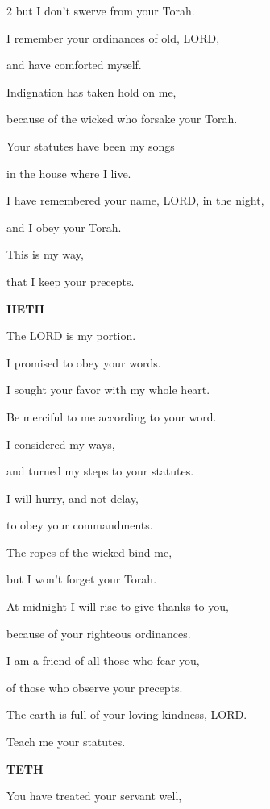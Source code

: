 \begin{multicols}{2}
	but I don’t swerve from your Torah.
	
	
	\myverse{}I remember your ordinances of old, LORD,
	
	and have comforted myself.
	
	
	\myverse{}Indignation has taken hold on me,
	
	because of the wicked who forsake your Torah.
	
	
	\myverse{}Your statutes have been my songs
	
	in the house where I live.
	
	
	\myverse{}I have remembered your name, LORD, in the night,
	
	and I obey your Torah.
	
	
	\myverse{}This is my way,
	
	that I keep your precepts.
	
	\vspace{\baselineskip}
	
	\textbf{HETH}
	
	
	\myverse{}The LORD is my portion.
	
	I promised to obey your words.
	
	
	\myverse{}I sought your favor with my whole heart.
	
	Be merciful to me according to your word.
	
	
	\myverse{}I considered my ways,
	
	and turned my steps to your statutes.
	
	
	\myverse{}I will hurry, and not delay,
	
	to obey your commandments.
	
	
	\myverse{}The ropes of the wicked bind me,
	
	but I won’t forget your Torah.
	
	
	\myverse{}At midnight I will rise to give thanks to you,
	
	because of your righteous ordinances.
	
	
	\myverse{}I am a friend of all those who fear you,
	
	of those who observe your precepts.
	
	
	\myverse{}The earth is full of your loving kindness, LORD.
	
	Teach me your statutes.
	
	\vspace{\baselineskip}
	
	\textbf{TETH}
	
	
	\myverse{}You have treated your servant well,
	

\end{multicols}
